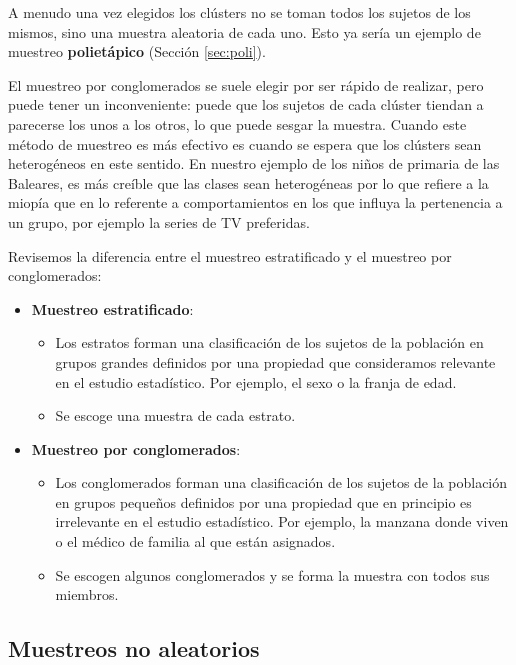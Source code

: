 \documentclass[
]{book}
\theoremstyle{definition}
\theoremstyle{definition}
\theoremstyle{definition}
\theoremstyle{definition}
\theoremstyle{remark}
\begin{document}
A menudo una vez elegidos los clústers no se toman todos los sujetos de los mismos, sino una muestra aleatoria de cada uno. Esto ya sería un ejemplo de muestreo \textbf{polietápico} (Sección \ref{sec:poli}).

El muestreo por conglomerados se suele elegir por ser rápido de realizar, pero puede tener un inconveniente: puede que los sujetos de cada clúster tiendan a parecerse los unos a los otros, lo que puede sesgar la muestra. Cuando este método de muestreo es más efectivo es cuando se espera que los clústers sean heterogéneos en este sentido. En nuestro ejemplo de los niños de primaria de las Baleares, es más creíble que las clases sean heterogéneas por lo que refiere a la miopía que en lo referente a comportamientos en los que influya la pertenencia a un grupo, por ejemplo la series de TV preferidas.

\begin{rmdimportant}
Revisemos la diferencia entre el muestreo estratificado y el muestreo por conglomerados:

\begin{itemize}
\item
  \textbf{Muestreo estratificado}:

  \begin{itemize}
  \item
    Los estratos forman una clasificación de los sujetos de la población en grupos grandes definidos por una propiedad que consideramos relevante en el estudio estadístico. Por ejemplo, el sexo o la franja de edad.
  \item
    Se escoge una muestra de cada estrato.
  \end{itemize}
\item
  \textbf{Muestreo por conglomerados}:

  \begin{itemize}
  \item
    Los conglomerados forman una clasificación de los sujetos de la población en grupos pequeños definidos por una propiedad que en principio es irrelevante en el estudio estadístico. Por ejemplo, la manzana donde viven o el médico de familia al que están asignados.
  \item
    Se escogen algunos conglomerados y se forma la muestra con todos sus miembros.
  \end{itemize}
\end{itemize}
\end{rmdimportant}

\hypertarget{sec:oport}{%
\subsection{Muestreos no aleatorios}\label{sec:oport}}
\end{document}
